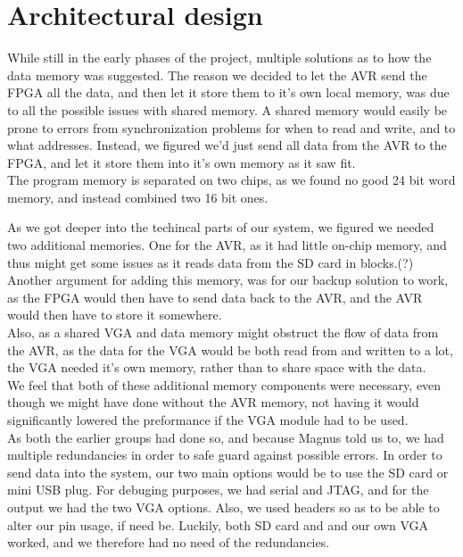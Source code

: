 \section {Architectural design}

While still in the early phases of the project, multiple solutions as to how the data memory was suggested. The reason we decided to let the AVR send the FPGA all the data, and then let it store them to it's own local memory, was due to all the possible issues with shared memory. A shared memory would easily be prone to errors from synchronization problems for when to read and write, and to what addresses. Instead, we figured we'd just send all data from the AVR to the FPGA, and let it store them into it's own memory as it saw fit.\\

The program memory is separated on two chips, as we found no good 24 bit word memory, and instead combined two 16 bit ones.

As we got deeper into the techincal parts of our system, we figured we needed two additional memories. One for the AVR, as it had little on-chip memory, and thus might get some issues as it reads data from the SD card in blocks.(?) Another argument for adding this memory, was for our backup solution to work, as the FPGA would then have to send data back to the AVR, and the AVR would then have to store it somewhere.\\

Also, as a shared VGA and data memory might obstruct the flow of data from the AVR, as the data for the VGA would be both read from and written to a lot, the VGA needed it's own memory, rather than to share space with the data.\\

We feel that both of these additional memory components were necessary, even though we might have done without the AVR memory, not having it would significantly lowered the preformance if the VGA module had to be used.\\

As both the earlier groups had done so, and because Magnus told us to, we had multiple redundancies in order to safe guard against possible errors. In order to send data into the system, our two main options would be to use the SD card or mini USB plug. For debuging purposes, we had serial and JTAG, and for the output we had the two VGA options. Also, we used headers so as to be able to alter our pin usage, if need be. Luckily, both SD card and and our own VGA worked, and we therefore had no need of the redundancies.
